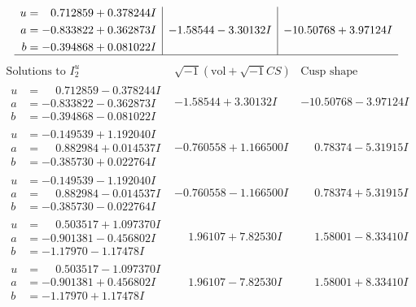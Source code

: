 \documentclass[1p]{elsarticle_modified}
\theoremstyle{definition}
\newcommand{\I}{\sqrt{-1}}
\begin{document}
$$\begin{array}{c|c|c}
\begin{aligned}
u &= \phantom{-}0.712859 + 0.378244 I \\
a &= -0.833822 + 0.362873 I \\
b &= -0.394868 + 0.081022 I\end{aligned}
 & -1.58544 - 3.30132 I & -10.50768 + 3.97124 I\\
 \hline 
 \end{array}$$\newpage$$\begin{array}{c|c|c}  
\text{Solutions to }I^u_{2}& \I (\text{vol} + \sqrt{-1}CS) & \text{Cusp shape}\\
 \hline 
\begin{aligned}
u &= \phantom{-}0.712859 - 0.378244 I \\
a &= -0.833822 - 0.362873 I \\
b &= -0.394868 - 0.081022 I\end{aligned}
 & -1.58544 + 3.30132 I & -10.50768 - 3.97124 I \\ \hline\begin{aligned}
u &= -0.149539 + 1.192040 I \\
a &= \phantom{-}0.882984 + 0.014537 I \\
b &= -0.385730 + 0.022764 I\end{aligned}
 & -0.760558 + 1.166500 I & \phantom{-}0.78374 - 5.31915 I \\ \hline\begin{aligned}
u &= -0.149539 - 1.192040 I \\
a &= \phantom{-}0.882984 - 0.014537 I \\
b &= -0.385730 - 0.022764 I\end{aligned}
 & -0.760558 - 1.166500 I & \phantom{-}0.78374 + 5.31915 I \\ \hline\begin{aligned}
u &= \phantom{-}0.503517 + 1.097370 I \\
a &= -0.901381 - 0.456802 I \\
b &= -1.17970 - 1.17478 I\end{aligned}
 & \phantom{-}1.96107 + 7.82530 I & \phantom{-}1.58001 - 8.33410 I \\ \hline\begin{aligned}
u &= \phantom{-}0.503517 - 1.097370 I \\
a &= -0.901381 + 0.456802 I \\
b &= -1.17970 + 1.17478 I\end{aligned}
 & \phantom{-}1.96107 - 7.82530 I & \phantom{-}1.58001 + 8.33410 I \\ \hline\begin{aligned}

\end{aligned}
\end{array}$$
\end{document}

